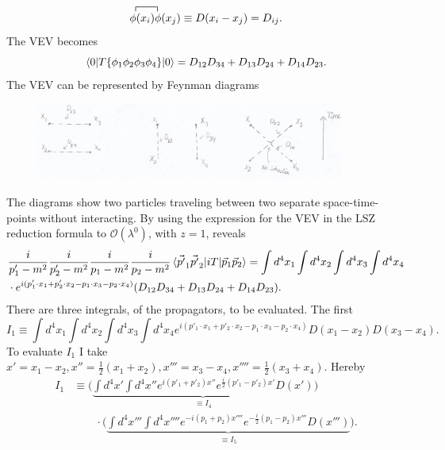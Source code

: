 \begin{example}
\begin{enumerate}
\begin{equation}
			\contraction{}{\phi_1}{,,}{\phi_2}
			\phi(x_i)\phi(x_j)\equiv D(x_i-x_j)=D_{ij}.
		\end{equation} 
		The VEV becomes
		\begin{equation}
			\braket{0|T\{\phi_1\phi_2\phi_3\phi_4\}|0}=D_{12}D_{34}+D_{13}D_{24}+D_{14}D_{23}.
		\end{equation} 
		The VEV can be represented by Feynman diagrams
		\begin{figure}[H]
			\captionsetup{width=1\textwidth}
			\centering
			\includegraphics[width=0.9\textwidth]{figures/scal}
		\end{figure} 
		The diagrams show two particles traveling between two separate space-time-points without interacting. By using the expression for the VEV in the LSZ reduction formula to $\mathcal{O}(\lambda^0)$, with $z=1$, reveals
		\begin{equation}
			\begin{split}
				&\frac{i}{p'_1-m^2}\frac{i}{p'_2-m^2}\frac{i}{p_1-m^2}\frac{i}{p_2-m^2}\braket{\vec{p'}_1\vec{p'}_2|iT|\vec{p}_1\vec{p}_2}=\int d^4x_1\int d^4x_2\int d^4x_3\int d^4x_4\\
				&\cdot e^{i(p'_1\cdot x_1+p'_2\cdot x_2-p_1\cdot x_3-p_2\cdot x_4)}(D_{12}D_{34}+D_{13}D_{24}+D_{14}D_{23}).
			\end{split}
		\end{equation} 
		There are three integrals, of the propagators, to be evaluated. The first
		\begin{equation}
			I_1\equiv \int d^4x_1\int d^4x_2\int d^4x_3\int d^4x_4 e^{i(p'_1\cdot x_1+p'_2\cdot x_2-p_1\cdot x_3-p_2\cdot x_4)}D(x_1-x_2)D(x_3-x_4).
		\end{equation} 
		To evaluate $I_1$ I take $x'=x_1-x_2, x''=\frac{1}{2}(x_1+x_2),x'''=x_3-x_4,x''''=\frac{1}{2}(x_3+x_4)$. Hereby
		\begin{equation}
			\begin{split}
				I_1&\equiv \bigg(\underbrace{\int d^4x' \int d^4x''e^{i(p'_1+p'_2)x''}e^{\frac{i}{2}(p'_1-p'_2)x'}D(x')}_{\equiv I_4}\bigg)\\
				&\qquad\cdot\bigg(\underbrace{\int d^4x''' \int d^4x''''e^{-i(p_1+p_2)x''''}e^{-\frac{i}{2}(p_1-p_2)x'''}D(x''')}_{\equiv I_5}\bigg).\\

\end{split}
\end{equation}
\end{enumerate}
\end{example}

